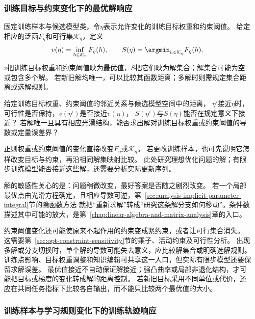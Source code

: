 \subsubsection{训练目标与约束变化下的最优解响应}
\label{sec:future-analysis-solution-sensitivity}

固定训练样本与候选模型类，令$\eta$表示允许变化的训练目标权重和约束阈值。
给定相应的泛函$F_\eta$和可行集$\mathcal K_\eta$，定义
\[
  v(\eta)=\inf_{h\in\mathcal K_\eta}F_\eta(h),\qquad
  S(\eta)=\argmin_{h\in\mathcal K_\eta}F_\eta(h).
\]
$v$把训练目标权重和约束阈值映为最优值，$S$把它们映为解集合；解集合可能为空或包含多个解。
若新旧解均唯一，可以比较其函数距离；多解时则需规定集合距离或选解规则。

\begin{mathproblem}[训练目标与约束变化造成的最优值与解集差异]
  \label{question:future-solution-sensitivity}
  给定训练目标权重、约束阈值的邻近关系与候选模型空间中的距离，
  $\eta'$接近$\eta$时，可行性是否保持，$v(\eta')$是否接近$v(\eta)$，
  $S(\eta')$与$S(\eta)$能否在规定意义下接近？
  若解唯一且具有相应光滑结构，能否求出解对训练目标权重或约束阈值的导数或定量误差界？
\end{mathproblem}

正则权重或约束阈值的变化直接改变$F_\eta$或$\mathcal K_\eta$。
若更改训练样本，也可先说明它怎样改变目标与约束，再沿相同解集映射比较。
此处研究理想优化问题的解；有限步训练模型能否接近这些解，还需要分析实际更新序列。

解的敏感性关心的是：问题稍微改变，最好答案是否随之剧烈改变。
若一个局部最优点由光滑方程确定，且相应导数可逆，第~\ref{sec:analysis-implicit-parameter-integral}节的隐函数方法
就把“重新求解”转成“研究这条解分支如何移动”。条件数描述其中可能的放大，是第~\ref{chap:linear-algebra-and-matrix-analysis}章的入口。

约束阈值变化还可能使原来不起作用的约束变成紧约束，或者让可行集合消失。
这需要第~\ref{sec:opt-constraint-sensitivity}节的乘子、活动约束及可行性分析。
出现多解或分支切换时，单个解的导数可能失去意义，应比较解集合或明确选解规则。
训练点影响、目标权重调整和知识编辑可共享这一入口，但实际有限步模型还要保留求解误差。
最优值接近不自动保证解接近；强凸曲率或局部非退化结构，才可能把目标或梯度的变化转成解的距离控制。
若新旧目标采用不同单位或代价，还应在共同任务指标下比较各自输出，而不能只比较两个最优值的大小。

\subsubsection{训练样本与学习规则变化下的训练轨迹响应}
\label{sec:future-analysis-iteration-perturbation}

